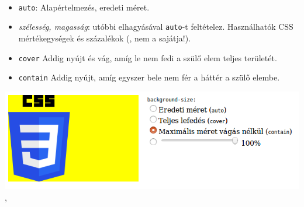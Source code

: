 \begin{frame}
  \begin{description}[m]
    \item[\texttt{background-size}] \hfill \\
      \begin{itemize}
        \item \texttt{auto}: Alapértelmezés, eredeti méret.
        \item \emph{szélesség, magasság}: utóbbi elhagyásával 
        \texttt{auto}-t feltételez. Használhatók CSS 
        mértékegységek és százalékok (, nem a sajátja!).
        \item \texttt{cover} Addig nyújt és vág, amíg le nem fedi a 
        szülő elem teljes területét.
        \item \texttt{contain} Addig nyújt, amíg egyszer bele nem fér a 
        háttér a szülő elembe.
      \end{itemize}
  \end{description}
  \vfill
  \begin{center}
    \includegraphics[scale=0.3]{meret.png}\\
    , 
  \end{center}
\end{frame}

